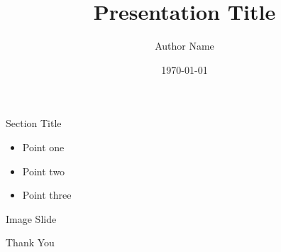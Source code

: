 \documentclass[aspectratio=169]{beamer}
\title{Presentation Title}
\author{Author Name}
\institute{Institution}
\date{\today}
\begin{document}
\begin{frame}
  \titlepage
\end{frame}

\begin{frame}{Section Title}
  \begin{itemize}
    \item Point one
    \item Point two
    \item Point three
  \end{itemize}
\end{frame}

\begin{frame}{Image Slide}
  \begin{center}
  \end{center}
\end{frame}

\begin{frame}
  \centering
  \Huge Thank You
\end{frame}
\end{document}
